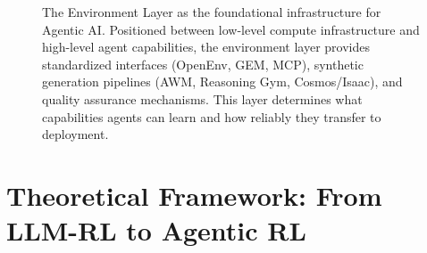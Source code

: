 \begin{figure}[tbp]
    \caption{The Environment Layer as the foundational infrastructure for Agentic AI. Positioned between low-level compute infrastructure and high-level agent capabilities, the environment layer provides standardized interfaces (OpenEnv, GEM, MCP), synthetic generation pipelines (AWM, Reasoning Gym, Cosmos/Isaac), and quality assurance mechanisms. This layer determines what capabilities agents can learn and how reliably they transfer to deployment.}
    \label{fig:env-layer}
\end{figure}

\section{ Theoretical Framework: From LLM-RL to Agentic RL}

